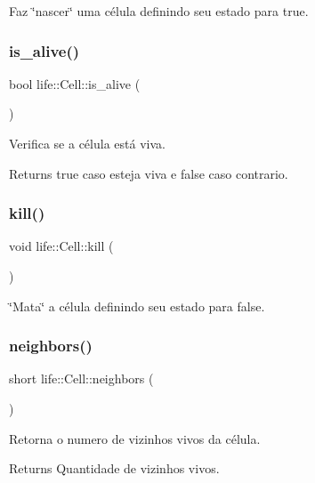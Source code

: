 Faz \char`\"{}nascer\char`\"{} uma célula definindo seu estado para true. \mbox{\label{classlife_1_1_cell_a5e7ef7bb158b50e5933e1f90e996117b}} 
\subsubsection{is\+\_\+alive()}
{\footnotesize\ttfamily bool life\+::\+Cell\+::is\+\_\+alive (\begin{DoxyParamCaption}{ }\end{DoxyParamCaption})\hspace{0.3cm}{\ttfamily [inline]}}

Verifica se a célula está viva. \begin{DoxyReturn}{Returns}
true caso esteja viva e false caso contrario. 
\end{DoxyReturn}
\mbox{\label{classlife_1_1_cell_a316d674703ad1821adccc9a897312a16}} 
\subsubsection{kill()}
{\footnotesize\ttfamily void life\+::\+Cell\+::kill (\begin{DoxyParamCaption}{ }\end{DoxyParamCaption})\hspace{0.3cm}{\ttfamily [inline]}}

\char`\"{}\+Mata\char`\"{} a célula definindo seu estado para false. \mbox{\label{classlife_1_1_cell_a9a1725f5da950d7361b685e3f4fac069}} 
\subsubsection{neighbors()}
{\footnotesize\ttfamily short life\+::\+Cell\+::neighbors (\begin{DoxyParamCaption}{ }\end{DoxyParamCaption})\hspace{0.3cm}{\ttfamily [inline]}}

Retorna o numero de vizinhos vivos da célula. \begin{DoxyReturn}{Returns}
Quantidade de vizinhos vivos. 
\end{DoxyReturn}
\mbox{\label{classlife_1_1_cell_a6c974500faca328ea0c92f804f8cff69}} 
